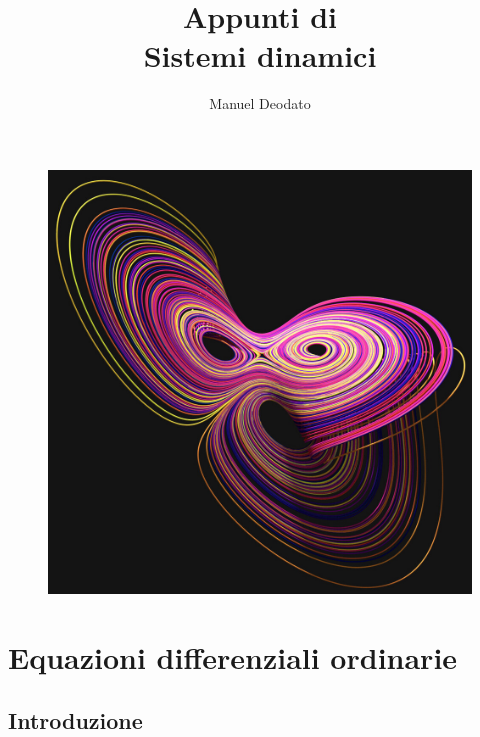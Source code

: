 \documentclass[12pt]{scrartcl}
\title{Appunti di\\ \vspace{.3cm} Sistemi dinamici}
\author{Manuel Deodato}
\date{}
\theoremstyle{style}
\renewcommand{\maketitle}{
\begin{center}
{\sffamily
{\fontsize{20}{20}\selectfont\MakeUppercase\thetitle}}

\vspace{0.2in}

{\large\scshape\theauthor}
\end{center}
}
\numberwithin{equation}{subsection}
\begin{document}
\maketitle
\vspace{6cm}
\begin{figure}[h!]
	\centering
	\includegraphics[width=.6\columnwidth]{front.jpeg}
\end{figure}

\newpage
\tableofcontents 
\newpage
\section{Equazioni differenziali ordinarie}
\subsection{Introduzione}
\end{document}
